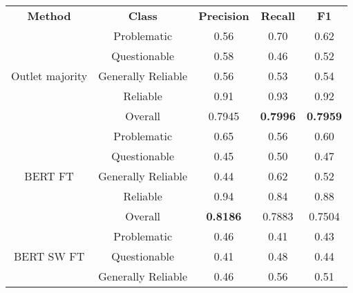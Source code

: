\begin{table}[htbp]
    \centering
    \begin{tabular}{| c | c | c | c | c |}
        \hline                            \textbf{Method} & \textbf{Class}     & \textbf{Precision} & \textbf{Recall} & \textbf{F1}     \\\cline{1-5}
        \multirow{5}{*}{Outlet majority}                  & Problematic        & 0.56               & 0.70            & 0.62            \\
                                                          & Questionable       & 0.58               & 0.46            & 0.52            \\
                                                          & Generally Reliable & 0.56               & 0.53            & 0.54            \\
                                                          & Reliable           & 0.91               & 0.93            & 0.92            \\\cline{2-5}
                                                          & Overall            & 0.7945             & \textbf{0.7996} & \textbf{0.7959} \\
        \hline
        \multirow{5}{*}{BERT FT}                          & Problematic        & 0.65               & 0.56            & 0.60            \\
                                                          & Questionable       & 0.45               & 0.50            & 0.47            \\
                                                          & Generally Reliable & 0.44               & 0.62            & 0.52            \\
                                                          & Reliable           & 0.94               & 0.84            & 0.88            \\\cline{2-5}
                                                          & Overall            & \textbf{0.8186}    & 0.7883          & 0.7504          \\
        \hline
        \multirow{5}{*}{BERT SW FT}                       & Problematic        & 0.46               & 0.41            & 0.43            \\
                                                          & Questionable       & 0.41               & 0.48            & 0.44            \\
                                                          & Generally Reliable & 0.46               & 0.56            & 0.51            \\

\end{tabular}
\end{table}
